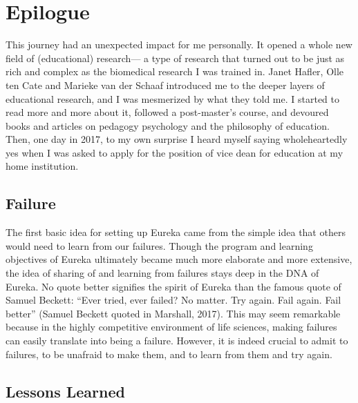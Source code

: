\documentclass[authordate, editorial, issue]{jote-new-article}
\begin{document}
	\section{Epilogue}



	 This journey had an unexpected impact for me personally. It opened a whole new field of (educational) research— a type of research that turned out to be just as rich and complex as the biomedical research I was trained in. Janet Hafler, Olle ten Cate and Marieke van der Schaaf introduced me to the deeper layers of educational research, and I was mesmerized by what they told me. I started to read more and more about it, followed a post-master's course, and devoured books and articles on pedagogy psychology and the philosophy of education. Then, one day in 2017, to my own surprise I heard myself saying wholeheartedly yes when I was asked to apply for the position of vice dean for education at my home institution.







	\subsection{Failure}



	The first basic idea for setting up Eureka came from the simple idea that others would need to learn from our failures. Though the program and learning objectives of Eureka ultimately became much more elaborate and more extensive, the idea of sharing of and learning from failures stays deep in the DNA of Eureka. No quote better signifies the spirit of Eureka than the famous quote of Samuel Beckett: “Ever tried, ever failed? No matter. Try again. Fail again. Fail better” (Samuel Beckett quoted in Marshall, 2017). This may seem remarkable because in the highly competitive environment of life sciences, making failures can easily translate into being a failure. However, it is indeed crucial to admit to failures, to be unafraid to make them, and to learn from them and try again.







	\subsection{Lessons Learned}
\end{document}
